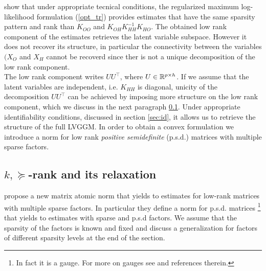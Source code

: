 \citet{chandrasekaran2010} show that under appropriate tecnical conditions, the regularized maximum log-likelihood formulation (\ref{opt_tr}) provides estimates  that have the same sparsity pattern and rank than $K_{OO}$ and $K_{OH}K_{HH}^{-1}K_{HO}$. The obtained low rank component of the estimates retrieves the latent variable subspace. However it does not recover its structure, in particular the connectivity between the variables $(X_{O}$ and $X_{H}$ cannot be recoverd since ther is not a unique decomposition of the low rank component.\\

The low rank component writes $UU^{\top}$, where $U\in\mathbb{R}^{p\times h}$. If we assume that the latent variables are independent, i.e. $K_{HH}$ is  diagonal,  unicity of the decomposition $UU^{\top}$ can be achieved by imposing more structure on the low rank component, which we discuss in the next paragraph \ref{subsec:norm}. Under appropriate identifiability conditions, discussed in section \ref{sec:id}, it allows us to retrieve the structure of the full LVGGM. In order to obtain a convex formulation we introduce a norm for low rank \textit{positive semidefinite} (p.s.d.) matrices with multiple sparse factors. 

 


%

\subsection{$k,\succeq$-rank and its relaxation}
\label{subsec:norm}

\citet{richard2014tight} propose a new matrix atomic norm that yields to estimates for low-rank matrices with multiple sparse factors. In particular they define a norm for p.s.d. matrices \footnote{In fact it is a gauge. For more on gauges see \citet{chandrasekaran2010convex} and references therein.}  that yields to estimates with sparse and p.s.d factors. We assume that the sparsity of the factors is known and fixed and discuss a generalization for factors of different sparsity levels at the end of the section.

